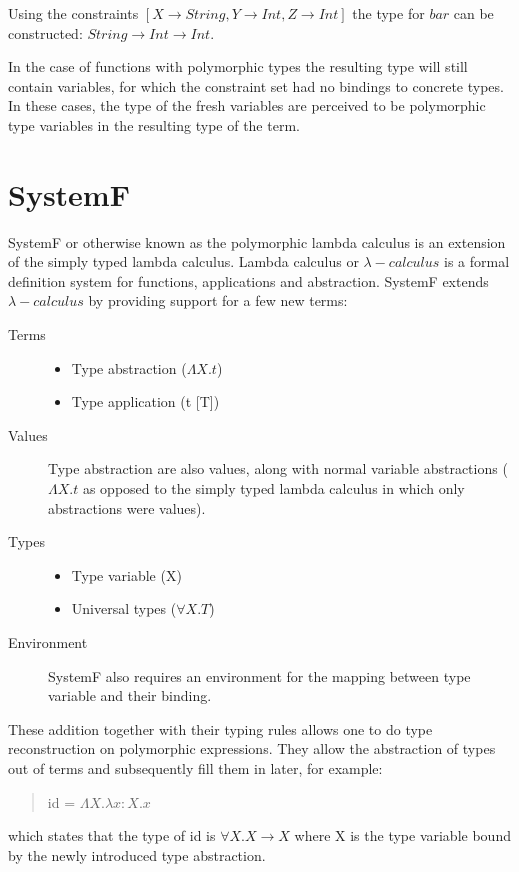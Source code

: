 \documentclass[twoside, titlepage, openright, a4paper]{book}
\newcommand{\Conid}[1]{\mathit{#1}}
\newcommand{\Varid}[1]{\mathit{#1}}
\newcommand{\ba}[1]{$[#1]$}
\begin{document}
Using the constraints {\ba{X\rightarrow String, Y\rightarrow Int, Z\rightarrow Int}} the type for \ensuremath{\Varid{bar}} can be constructed: \ensuremath{\Conid{String}\to \Conid{Int}\to \Conid{Int}}.

In the case of functions with polymorphic types the resulting type will still contain variables, for which the constraint set had no bindings to concrete types. In these cases, the type of the fresh variables are perceived to be polymorphic type variables in the resulting type of the term.

\section{SystemF}
\label{SystemF}
SystemF or otherwise known as the polymorphic lambda calculus is an extension of the simply typed lambda calculus. Lambda calculus or $\lambda-calculus$  is a formal definition system for functions, applications and abstraction. SystemF extends $\lambda-calculus$ by providing support for a few new terms:

\begin{description}
\item[Terms]{
	\begin{minipage}[t]{\linewidth}
		\begin{itemize}
			\item Type abstraction ($\Lambda X.t$)
			\item Type application (t [T])
		\end{itemize}
	\end{minipage}
}
\item[Values] Type abstraction are also values, along with normal variable abstractions ($\Lambda X.t$ as opposed to the simply typed lambda calculus in which only abstractions were values).
\item[Types]{ 
	\begin{minipage}[t]{\linewidth}
		\begin{itemize}
			\item Type variable (X)
			\item Universal types ($\forall X. T$)
		\end{itemize}
	\end{minipage}
}
\item[Environment] SystemF also requires an environment for the mapping between type variable and their binding.
\end{description}

These addition together with their typing rules allows one to do type reconstruction on polymorphic expressions. They allow the abstraction of types out of terms and subsequently fill them in later, for example:
\begin{quotation}
id = $\Lambda X.\lambda x:X. x$
\end{quotation}
which states that the type of id is $\forall X. X \rightarrow X$ where X is the type variable bound by the newly introduced type abstraction. 
\end{document}

